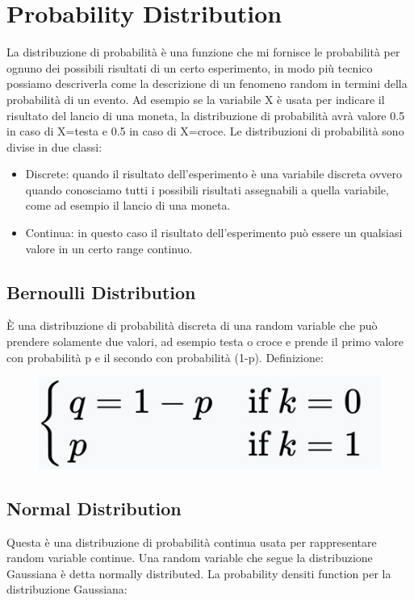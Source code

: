 \documentclass[14pt]{extreport}
\begin{document}
\section{Probability Distribution}

La distribuzione di probabilità è una funzione che mi fornisce le probabilità per ognuno dei possibili risultati di un certo esperimento, in modo più
tecnico possiamo descriverla come la descrizione di un fenomeno random in termini della probabilità di un evento. Ad esempio se la variabile X è usata
per indicare il risultato del lancio di una moneta, la distribuzione di probabilità avrà valore 0.5 in caso di X=testa e 0.5 in caso di X=croce. Le
distribuzioni di probabilità sono divise in due classi:
\begin{itemize}
\item Discrete: quando il risultato dell'esperimento è una variabile discreta ovvero quando conosciamo tutti i possibili risultati assegnabili a
quella variabile, come ad esempio il lancio di una moneta.
\item Continua: in questo caso il risultato dell'esperimento può essere un qualsiasi valore in un certo range continuo.
\end{itemize}

\subsection{Bernoulli Distribution}

È una distribuzione di probabilità discreta di una random variable che può prendere solamente due valori, ad esempio testa o croce e prende il primo
valore con probabilità p e il secondo con probabilità (1-p). Definizione:

\begin{figure}[H]
\centering
\includegraphics[width=0.3\linewidth]{95.jpeg}
\end{figure}

\subsection{Normal Distribution}

Questa è una distribuzione di probabilità continua usata per rappresentare random variable continue. Una random variable che segue la distribuzione
Gaussiana è detta normally distributed. La probability densiti function per la distribuzione Gaussiana:
\end{document}
